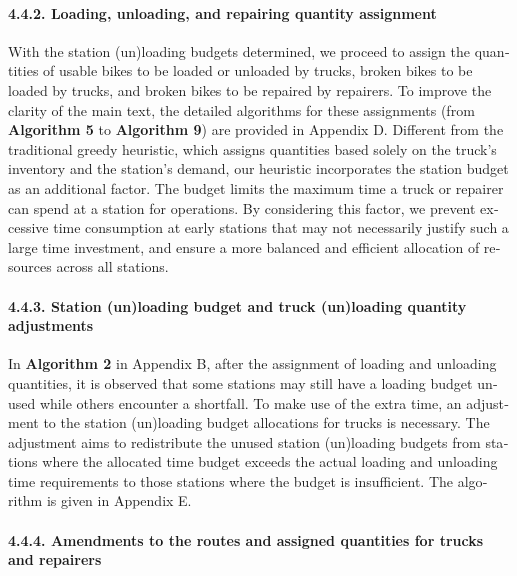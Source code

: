 \documentclass[
  english,
]{article}
\begin{document}
\begin{otherlanguage}{english}
\protect{}\label{s0075}
\paragraph{4.4.2. Loading, unloading, and repairing quantity assignment}\label{st095}

\protect{}\label{p0515}
With the station (un)loading budgets determined, we proceed to assign the quantities of usable bikes
to be loaded or unloaded by trucks, broken bikes to be loaded by trucks, and broken bikes to be
repaired by repairers. To improve the clarity of the main text, the detailed algorithms for these
assignments (from \textbf{Algorithm 5} to \textbf{Algorithm 9}) are provided in Appendix D.
Different from the traditional greedy heuristic, which assigns quantities based solely on the
truck's inventory and the station's demand, our heuristic incorporates the station budget as an
additional factor. The budget limits the maximum time a truck or repairer can spend at a station for
operations. By considering this factor, we prevent excessive time consumption at early stations that
may not necessarily justify such a large time investment, and ensure a more balanced and efficient
allocation of resources across all stations.

\protect{}\label{s0080}
\paragraph{4.4.3. Station (un)loading budget and truck (un)loading quantity
adjustments}\label{st100}

\protect{}\label{p0520}
In \textbf{Algorithm 2} in Appendix B, after the assignment of loading and unloading quantities, it
is observed that some stations may still have a loading budget unused while others encounter a
shortfall. To make use of the extra time, an adjustment to the station (un)loading budget
allocations for trucks is necessary. The adjustment aims to redistribute the unused station
(un)loading budgets from stations where the allocated time budget exceeds the actual loading and
unloading time requirements to those stations where the budget is insufficient. The algorithm is
given in Appendix E.

\protect{}\label{s0085}
\paragraph{4.4.4. Amendments to the routes and assigned quantities for trucks and
repairers}\label{st105}


\end{otherlanguage}
\end{document}
